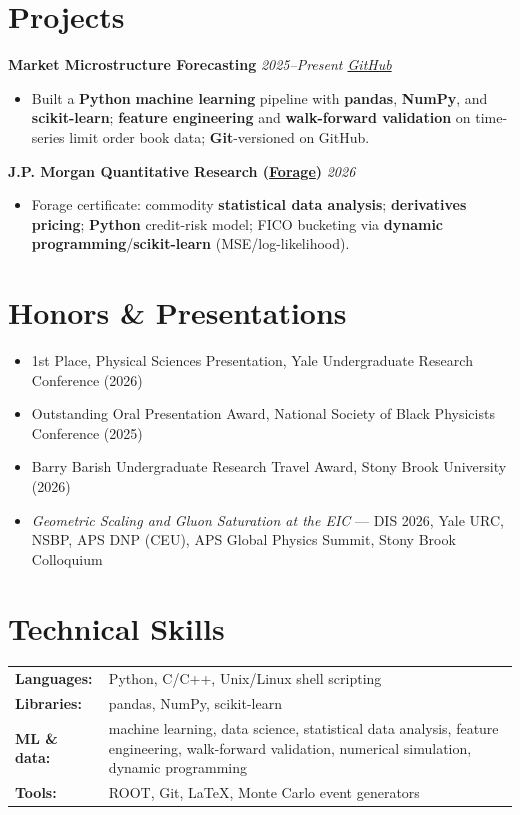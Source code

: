 \documentclass[11pt,letterpaper]{article}
\newcommand{\lineitem}[2]{%
  \textbf{#1} \hfill \textit{#2}\\[-2pt]
}
\newcommand{\cvitem}[1]{\item #1}
\begin{document}
\section{Projects}

\lineitem{Market Microstructure Forecasting}{2025--Present \quad \href{https://github.com/iRojae/market-microstructure-forecasting}{GitHub}}
\begin{itemize}
  \cvitem{Built a \textbf{Python} \textbf{machine learning} pipeline with \textbf{pandas}, \textbf{NumPy}, and \textbf{scikit-learn}; \textbf{feature engineering} and \textbf{walk-forward validation} on time-series limit order book data; \textbf{Git}-versioned on GitHub.}
\end{itemize}

\lineitem{J.P. Morgan Quantitative Research (\href{https://www.theforage.com/simulations/jpmorgan/quantitative-research-11oc}{Forage})}{2026}
\begin{itemize}
  \cvitem{Forage certificate: commodity \textbf{statistical data analysis}; \textbf{derivatives pricing}; \textbf{Python} credit-risk model; FICO bucketing via \textbf{dynamic programming}/\textbf{scikit-learn} (MSE/log-likelihood).}
\end{itemize}

\section{Honors \& Presentations}
\begin{itemize}
  \cvitem{1st Place, Physical Sciences Presentation, Yale Undergraduate Research Conference (2026)}
  \cvitem{Outstanding Oral Presentation Award, National Society of Black Physicists Conference (2025)}
  \cvitem{Barry Barish Undergraduate Research Travel Award, Stony Brook University (2026)}
  \cvitem{\textit{Geometric Scaling and Gluon Saturation at the EIC} --- DIS 2026, Yale URC, NSBP, APS DNP (CEU), APS Global Physics Summit, Stony Brook Colloquium}
\end{itemize}

\section{Technical Skills}
\begin{tabularx}{\textwidth}{@{}>{\bfseries}l X@{}}
Languages: & Python, C/C++, Unix/Linux shell scripting \\
Libraries: & pandas, NumPy, scikit-learn \\
ML \& data: & machine learning, data science, statistical data analysis, feature engineering, walk-forward validation, numerical simulation, dynamic programming \\
Tools: & ROOT, Git, LaTeX, Monte Carlo event generators
\end{tabularx}
\end{document}
